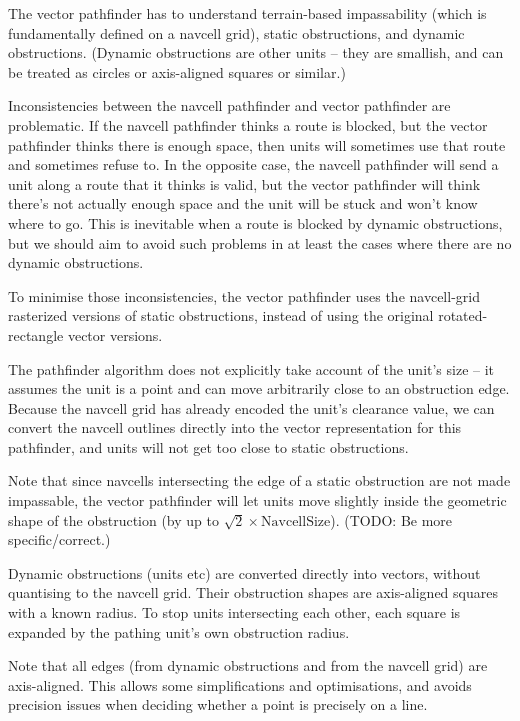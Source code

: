 \documentclass[a4paper,10pt]{article}
\begin{document}
The vector pathfinder has to understand terrain-based impassability
(which is fundamentally defined on a navcell grid),
static obstructions, and dynamic obstructions.
(Dynamic obstructions are other units -- they are smallish,
and can be treated as circles or axis-aligned squares or similar.)

Inconsistencies between the navcell pathfinder and vector pathfinder are problematic.
If the navcell pathfinder thinks a route is blocked,
but the vector pathfinder thinks there is enough space,
then units will sometimes use that route and sometimes refuse to.
In the opposite case, the navcell pathfinder will send a unit along a route
that it thinks is valid,
but the vector pathfinder will think there's not actually enough space
and the unit will be stuck and won't know where to go.
This is inevitable when a route is blocked by dynamic obstructions,
but we should aim to avoid such problems in at least the cases where there are
no dynamic obstructions.

To minimise those inconsistencies,
the vector pathfinder uses the navcell-grid rasterized versions of static obstructions,
instead of using the original rotated-rectangle vector versions.

The pathfinder algorithm does not explicitly take account of the unit's size --
it assumes the unit is a point and can move arbitrarily close to an obstruction edge.
Because the navcell grid has already encoded the unit's clearance value,
we can convert the navcell outlines directly into the vector representation
for this pathfinder, and units will not get too close to static obstructions.

Note that since navcells intersecting the edge of a static obstruction
are not made impassable,
the vector pathfinder will let units move slightly inside the
geometric shape of the obstruction
(by up to $\sqrt{2}\times\mathrm{NavcellSize}$).
(TODO: Be more specific/correct.)

Dynamic obstructions (units etc) are converted directly into vectors,
without quantising to the navcell grid.
Their obstruction shapes are axis-aligned squares with a known radius.
To stop units intersecting each other,
each square is expanded by the pathing unit's own obstruction radius.

Note that all edges (from dynamic obstructions and from the navcell grid)
are axis-aligned. This allows some simplifications and optimisations,
and avoids precision issues when deciding whether a point is precisely on a line.
\end{document}
